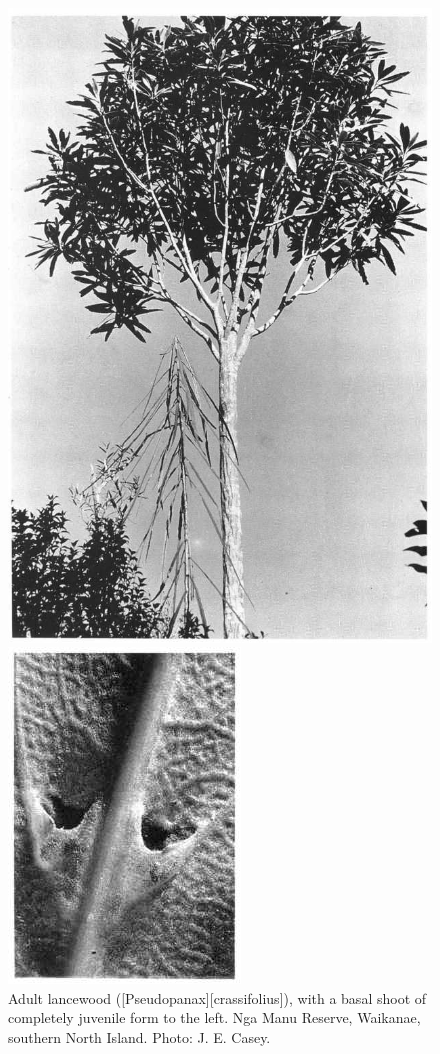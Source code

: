 \begin{figure}[htb]
	\centering
	\begin{minipage}[t]{0.475\textwidth}
		\centering
		\includegraphics[height=\textwidth]{graphics/figure20lancewood.jpg}
    	\caption[Adult lancewood]{Adult lancewood ([Pseudopanax][crassifolius]), with a basal shoot of completely juvenile form to the left.
        Nga Manu Reserve, Waikanae, southern North Island.
    	Photo: J. E. Casey.}%
    	\label{fig:20lancewood}
	\end{minipage}\hfill%
	\begin{minipage}[t]{0.475\textwidth}
    	\centering
    	\includegraphics[height=\textwidth]{graphics/figure23hinau.jpg}

\end{minipage}
\end{figure}
